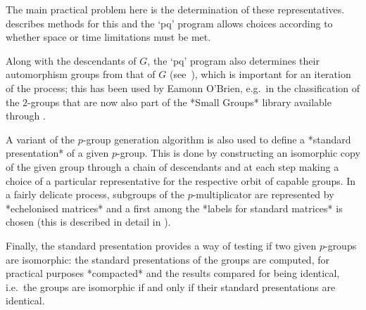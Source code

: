 The  main  practical  problem  here  is  the  determination  of  these
representatives. \cite{OBr90} describes methods for this and the  `pq'
program allows choices according to whether space or time  limitations
must be met.

Along with the descendants of $G$, the `pq'  program  also  determines
their automorphism groups from that of $G$  (see~\cite{OBr95}),  which
is important for an iteration of the process; this has  been  used  by
Eamonn O'Brien, e.g.~in the classification of the $2$-groups that  are
now also part of the *Small Groups* library available through {\GAP}.

A variant of the $p$-group generation algorithm is also used to define
a *standard presentation* of  a  given  $p$-group.  This  is  done  by
constructing an isomorphic copy of the given group through a chain  of
descendants  and  at  each  step  making  a  choice  of  a  particular
representative for the respective orbit of capable groups. In a fairly
delicate process, subgroups of the $p$-multiplicator  are  represented
by *echelonised matrices* and a first among the *labels  for  standard
matrices* is chosen (this is described in detail in \cite{OBr94}).

Finally, the standard presentation provides a way of  testing  if  two
given $p$-groups are isomorphic: the  standard  presentations  of  the
groups are  computed,  for  practical  purposes  *compacted*  and  the
results compared for being identical, i.e.~the groups  are  isomorphic
if and only if their standard presentations are identical.

